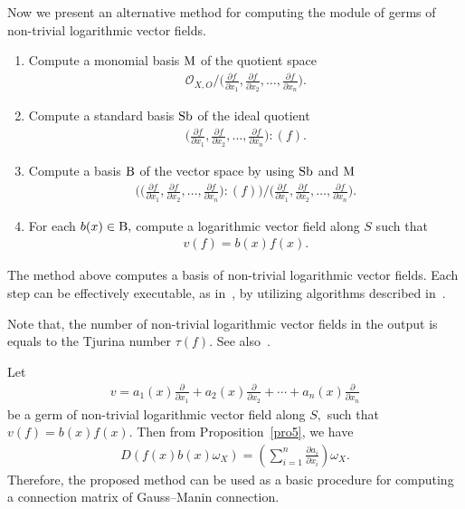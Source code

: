 \documentclass[10pt,a4paper]{amsart}
\numberwithin{equation}{section}
\begin{document}
Now we present an alternative method for computing the module of germs of non-trivial logarithmic vector fields.
\begin{enumerate}\itemsep=0pt
\setlength{\leftskip}{0.45cm}
\item[{\it Step} 1:] Compute a monomial basis ${\rm M} $ of the quotient space
\begin{gather*}
{\mathcal O}_{X,O}\Big/\bigg(\frac{\partial f}{\partial x_1}, \frac{\partial f}{\partial x_2}, \dots, \frac{\partial f}{\partial x_n}\bigg).
\end{gather*}

\item[{\it Step} 2:] Compute a standard basis ${\rm Sb}$ of the ideal quotient
\begin{gather*}
\bigg(\frac{\partial f}{\partial x_1}, \frac{\partial f}{\partial x_2}, \dots, \frac{\partial f}{\partial x_n}\bigg) : (f).
\end{gather*}
\item[{\it Step} 3:] Compute a basis $ {\rm B} $ of the vector space by using $ {\rm Sb} $ and $ {\rm M} $
\begin{gather*}
\bigg(\bigg(\frac{\partial f}{\partial x_1}, \frac{\partial f}{\partial x_2}, \dots, \frac{\partial f}{\partial x_n}\bigg) : (f)\bigg)\Big/
\bigg(\frac{\partial f}{\partial x_1}, \frac{\partial f}{\partial x_2}, \dots, \frac{\partial f}{\partial x_n}\bigg).
\end{gather*}
\item[{\it Step} 4:] For each $ b(x) \in {\rm B}, $ compute a logarithmic vector field along $S$ such that
\begin{gather*}
v(f)=b(x)f(x).
\end{gather*}
\end{enumerate}

The method above computes a basis of non-trivial logarithmic vector fields.
Each step can be effectively executable, as in~\cite{TN20}, by utilizing algorithms described in~\cite{NT16a,NT16b,NT17a,TNN}.

Note that, the number of non-trivial logarithmic vector fields in the output is equals to the Tjurina number $ \tau(f)$. See also~\cite{M}.


 Let
\begin{gather*}
v=a_1(x)\frac{\partial}{\partial x_1} + a_2(x)\frac{\partial}{\partial x_2}+ \cdots +a_n(x)\frac{\partial}{\partial x_n}
\end{gather*}
be a germ of non-trivial logarithmic vector field along $S, $ such that $ v(f) = b(x)f(x)$. Then from Proposition~\ref{pro5},
we have
\begin{gather*}
D(f(x)b(x)\omega_X) = \left( \sum_{i=1}^{n} \frac{\partial a_i}{\partial x_i} \right) \omega_X.
\end{gather*}
Therefore, the proposed method can be used as a basic procedure for computing a connection matrix of Gauss--Manin connection.
\end{document}
